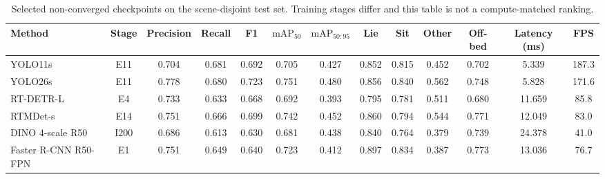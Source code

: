 \begin{table}[t]
\centering
\caption{Selected non-converged checkpoints on the scene-disjoint test set. Training stages differ and this table is not a compute-matched ranking.}
\label{tab:ir_detection_early_selected}
\scriptsize
\setlength{\tabcolsep}{2pt}
\renewcommand{\arraystretch}{1.10}
\begin{tabular}{lcccccccccccc}
\toprule
Method & Stage & Precision & Recall & F1
& $\mathrm{mAP}_{50}$ & $\mathrm{mAP}_{50:95}$
& Lie & Sit & Other & Off-bed & Latency (ms) & FPS \\
\midrule
YOLO11s & E11 & 0.704 & 0.681 & 0.692 & 0.705 & 0.427 & 0.852 & 0.815 & 0.452 & 0.702 & 5.339 & 187.3 \\
YOLO26s & E11 & 0.778 & 0.680 & 0.723 & 0.751 & 0.480 & 0.856 & 0.840 & 0.562 & 0.748 & 5.828 & 171.6 \\
RT-DETR-L & E4 & 0.733 & 0.633 & 0.668 & 0.692 & 0.393 & 0.795 & 0.781 & 0.511 & 0.680 & 11.659 & 85.8 \\
RTMDet-s & E14 & 0.751 & 0.666 & 0.699 & 0.742 & 0.452 & 0.860 & 0.794 & 0.544 & 0.771 & 12.049 & 83.0 \\
DINO 4-scale R50 & I200 & 0.686 & 0.613 & 0.630 & 0.681 & 0.438 & 0.840 & 0.764 & 0.379 & 0.739 & 24.378 & 41.0 \\
Faster R-CNN R50-FPN & E1 & 0.751 & 0.649 & 0.640 & 0.723 & 0.412 & 0.897 & 0.834 & 0.387 & 0.773 & 13.036 & 76.7 \\
\bottomrule
\end{tabular}
\end{table}

